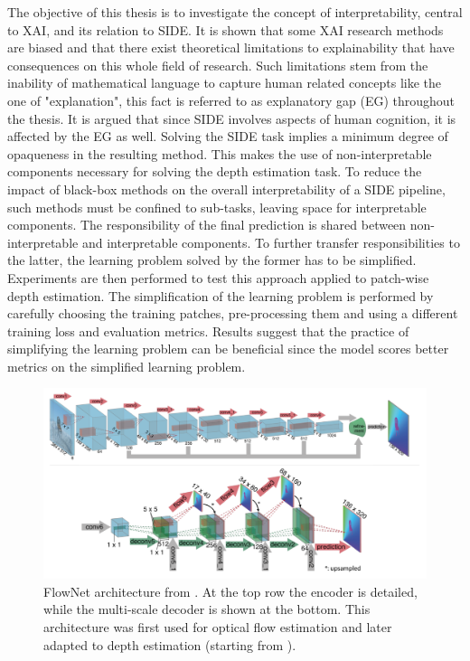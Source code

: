The objective of this thesis is to investigate the concept of interpretability, central to XAI, and its relation to SIDE.
It is shown that some XAI research methods are biased and that there exist theoretical limitations to explainability that have consequences on this whole field of research.
Such limitations stem from the inability of mathematical language to capture human related concepts like the one of "explanation", this fact is referred to as explanatory gap (EG) throughout the thesis.
It is argued that since SIDE involves aspects of human cognition, it is affected by the EG as well.
Solving the SIDE task implies a minimum degree of opaqueness in the resulting method.
This makes the use of non-interpretable components necessary for solving the depth estimation task.
To reduce the impact of black-box methods on the overall interpretability of a SIDE pipeline, such methods must be confined to sub-tasks, leaving space for interpretable components.
The responsibility of the final prediction is shared between non-interpretable and interpretable components.
To further transfer responsibilities to the latter, the learning problem solved by the former has to be simplified.
Experiments are then performed to test this approach applied to patch-wise depth estimation.
The simplification of the learning problem is performed by carefully choosing the training patches, pre-processing them and using a different training loss and evaluation metrics.
Results suggest that the practice of simplifying the learning problem can be beneficial since the model scores better metrics on the simplified learning problem.

\begin{figure}
    \begin{adjustwidth}{-0.2\textwidth}{-0.2\textwidth}
    \centering
    \includegraphics[scale=0.4]{figs/flow_net}
    \end{adjustwidth}
    \caption[Example of architecture used for depth estimation.]{
        FlowNet architecture from \cite{FlowNet}.
        At the top row the encoder is detailed, while the multi-scale decoder is shown at the bottom.
        This architecture was first used for optical flow estimation and later adapted to depth estimation (starting from \cite{DispNet}).
        \label{fig:flow_net}    
    }
\end{figure}

